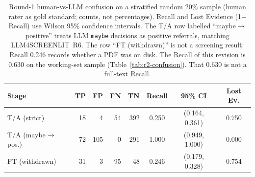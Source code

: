 \begin{table}[htbp]
\centering
\caption{Round-1 human-vs-LLM confusion on a stratified random 20\% sample (human rater as gold standard; counts, not percentages). Recall and Lost Evidence (1$-$Recall) use Wilson 95\% confidence intervals. The T/A row labelled ``maybe$\rightarrow$positive'' treats LLM \texttt{maybe} decisions as positive referrals, matching LLM4SCREENLIT~R6. The row ``FT (withdrawn)'' is not a screening result: Recall 0.246 records whether a PDF was on disk. The Recall of this revision is 0.630 on the working-set sample (Table~\ref{tab:r2-confusion}). That 0.630 is not a full-text Recall.}
\label{tab:human-confusion}
\small
\setlength{\tabcolsep}{3pt}
\begin{tabular}{l rrrr c c c}
\toprule
Stage & TP & FP & FN & TN & Recall & 95\% CI & Lost Ev. \\
\midrule
T/A (strict) & 18 & 4 & 54 & 392 & 0.250 & (0.164, 0.361) & 0.750 \\
T/A (maybe$\rightarrow$pos.) & 72 & 105 & 0 & 291 & 1.000 & (0.949, 1.000) & 0.000 \\
FT (withdrawn) & 31 & 3 & 95 & 48 & 0.246 & (0.179, 0.328) & 0.754 \\
\bottomrule
\end{tabular}
\end{table}